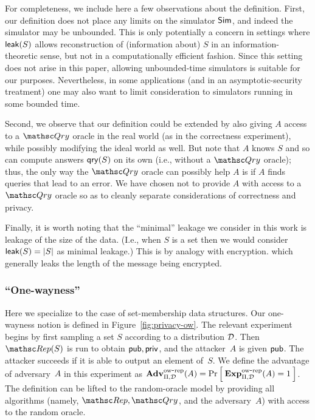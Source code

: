 For completeness, we include here a few observations about the definition.
First, our definition does not place any limits on the simulator ${\sf Sim}$, and indeed
the simulator may be unbounded. This is only potentially a concern in settings
where ${\sf leak}(S)$ allows reconstruction of (information about) $S$ in an information-theoretic
sense, but not in a computationally efficient fashion. Since this setting does not arise
in this paper, allowing unbounded-time simulators is suitable for our purposes. Nevertheless,
in some applications (and in an asymptotic-security treatment) one may also want to limit consideration
to simulators running in some bounded time.

Second, we observe that our definition could be extended by also giving $A$ access to a $\Qry$
oracle in the real world (as in the correctness experiment), while possibly modifying the
ideal world as well. But note that
$A$ knows $S$ and so can compute answers $\mathsf{qry}(S)$ on its own (i.e., without a $\Qry$ oracle);
thus, the only way the $\Qry$ oracle can possibly help $A$ is if $A$ finds queries
that lead to an error.
We have chosen not to provide $A$ with
access to a $\Qry$ oracle so as to cleanly separate considerations
of correctness and privacy.

Finally, it is worth noting that the ``minimal'' leakage we consider in this work
is leakage of the size of the data. (I.e., when $S$ is a set then we would
consider ${\sf leak}(S)=|S|$ as minimal leakage.) This is by analogy with encryption.
which generally leaks the length of the message being encrypted.


\subsubsection{``One-wayness''}

Here we specialize to the case of set-membership data structures.
Our one-wayness notion is defined in Figure~\ref{fig:privacy-ow}.
The relevant experiment begins by first sampling a set $S$ according to a distribution
${\cal D}$. Then $\Rep(S)$ is run to obtain ${\sf pub},{\sf priv}$, and the attacker~$A$ is given
${\sf pub}$. The attacker succeeds if it is able to output an element of~$S$.
We define the advantage of adversary~$A$ in this experiment
as $\mathrm{\mathbf{Adv}}^{\mathrm{ow\mbox{-}rep}}_{\Pi,\mathcal{D}}(A) = \Pr\left[\: \mathrm{\mathbf{Exp}}^{\mathrm{ow\mbox{-}rep}}_{\Pi,{\cal D}}(A)=1 \:\right]$.
The definition can be lifted to the random-oracle model by providing
all algorithms (namely, $\Rep,\Qry$, and the adversary~$A$) with access to the
random oracle. 

